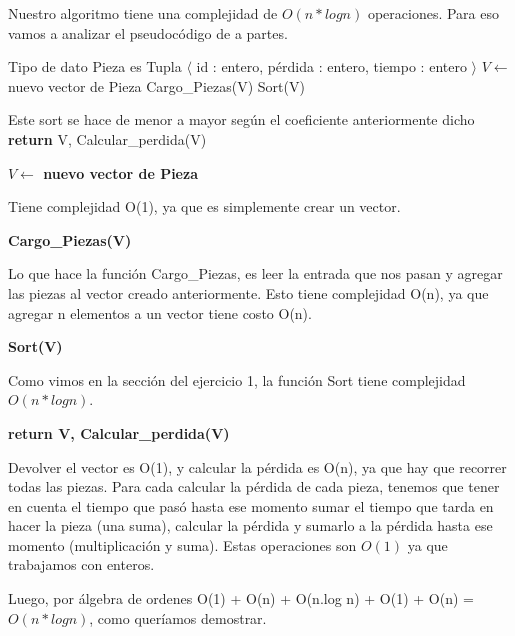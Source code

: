 Nuestro algoritmo tiene una complejidad de $O(n*log n)$ operaciones. Para eso vamos a analizar el pseudocódigo de a partes.

\begin{pseudo}
\State Tipo de dato Pieza es Tupla $\langle$ id : entero, pérdida : entero, tiempo : entero $\rangle$
        \State $V \leftarrow$ nuevo vector de Pieza 
        \State Cargo\_Piezas(V) 
        \State Sort(V) 
        
        \Comment Este sort se hace de menor a mayor según el coeficiente anteriormente dicho
        \State \textbf{return} V, Calcular\_perdida(V) 
    \EndProcedure
\end{pseudo}

\begin{pseudo}
 \State  \textbf{$V \leftarrow$ nuevo vector de Pieza}
\end{pseudo}

Tiene complejidad O(1), ya que es simplemente crear un vector.

\begin{pseudo}
 \State \textbf{Cargo\_Piezas(V)}
\end{pseudo}

Lo que hace la función Cargo\_Piezas, es leer la entrada que nos pasan y agregar las piezas al vector creado anteriormente. Esto tiene complejidad O(n), ya que agregar n elementos a un vector tiene costo O(n).

\begin{pseudo}
 \State \textbf{Sort(V)}
\end{pseudo}

Como vimos en la sección del ejercicio 1, la función Sort tiene complejidad $O(n*log n)$.

\begin{pseudo}
 \State \textbf{return V, Calcular\_perdida(V)}
\end{pseudo}

Devolver el vector es O(1), y calcular la pérdida es O(n), ya que hay que recorrer todas las piezas. Para cada calcular la pérdida de cada pieza, tenemos que tener en cuenta el tiempo que pasó hasta ese momento sumar el tiempo que tarda en hacer la pieza (una suma), calcular la pérdida y sumarlo a la pérdida hasta ese momento (multiplicación y suma). Estas operaciones son $O(1)$ ya que trabajamos con enteros.

Luego, por álgebra de ordenes O(1) + O(n) + O(n.log n) + O(1) + O(n) = $O(n*log n)$, como queríamos demostrar.